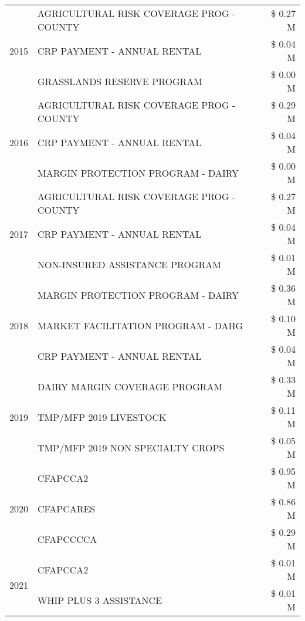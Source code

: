 \begin{tabular}{llr}
\multirow[t]{3}{*}{2015} & AGRICULTURAL RISK COVERAGE PROG - COUNTY & \$ 0.27 M \\
 & CRP PAYMENT - ANNUAL RENTAL & \$ 0.04 M \\
 & GRASSLANDS RESERVE PROGRAM & \$ 0.00 M \\
\cline{1-3}
\multirow[t]{3}{*}{2016} & AGRICULTURAL RISK COVERAGE PROG - COUNTY & \$ 0.29 M \\
 & CRP PAYMENT - ANNUAL RENTAL & \$ 0.04 M \\
 & MARGIN PROTECTION PROGRAM - DAIRY & \$ 0.00 M \\
\cline{1-3}
\multirow[t]{3}{*}{2017} & AGRICULTURAL RISK COVERAGE PROG - COUNTY & \$ 0.27 M \\
 & CRP PAYMENT - ANNUAL RENTAL & \$ 0.04 M \\
 & NON-INSURED ASSISTANCE PROGRAM & \$ 0.01 M \\
\cline{1-3}
\multirow[t]{3}{*}{2018} & MARGIN PROTECTION PROGRAM - DAIRY & \$ 0.36 M \\
 & MARKET FACILITATION PROGRAM - DAHG & \$ 0.10 M \\
 & CRP PAYMENT - ANNUAL RENTAL & \$ 0.04 M \\
\cline{1-3}
\multirow[t]{3}{*}{2019} & DAIRY MARGIN COVERAGE PROGRAM & \$ 0.33 M \\
 & TMP/MFP 2019 LIVESTOCK & \$ 0.11 M \\
 & TMP/MFP 2019 NON SPECIALTY CROPS & \$ 0.05 M \\
\cline{1-3}
\multirow[t]{3}{*}{2020} & CFAPCCA2 & \$ 0.95 M \\
 & CFAPCARES & \$ 0.86 M \\
 & CFAPCCCCA & \$ 0.29 M \\
\cline{1-3}
\multirow[t]{2}{*}{2021} & CFAPCCA2 & \$ 0.01 M \\
 & WHIP PLUS 3 ASSISTANCE & \$ 0.01 M \\
\cline{1-3}
\bottomrule
\end{tabular}
